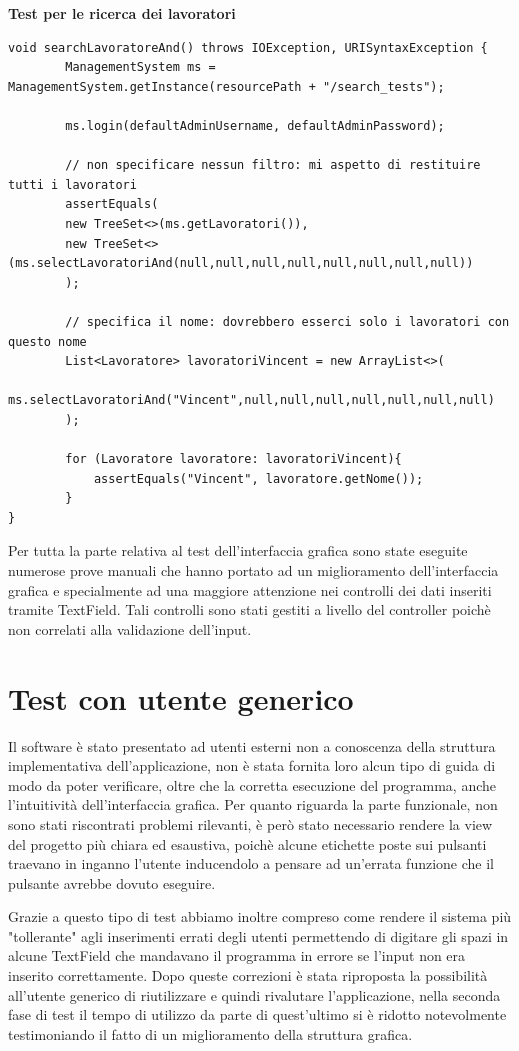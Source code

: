 \documentclass[ 4paper,11pt,openany]{book}
\begin{document}
\textbf{Test per le ricerca dei lavoratori}
\begin{lstlisting}[basicstyle=\small,xleftmargin=-0.5cm]
    void searchLavoratoreAnd() throws IOException, URISyntaxException {
        ManagementSystem ms = ManagementSystem.getInstance(resourcePath + "/search_tests");

        ms.login(defaultAdminUsername, defaultAdminPassword);

        // non specificare nessun filtro: mi aspetto di restituire tutti i lavoratori
        assertEquals(
        new TreeSet<>(ms.getLavoratori()),
        new TreeSet<>(ms.selectLavoratoriAnd(null,null,null,null,null,null,null,null))
        );

        // specifica il nome: dovrebbero esserci solo i lavoratori con questo nome
        List<Lavoratore> lavoratoriVincent = new ArrayList<>(
        ms.selectLavoratoriAnd("Vincent",null,null,null,null,null,null,null)
        );

        for (Lavoratore lavoratore: lavoratoriVincent){
            assertEquals("Vincent", lavoratore.getNome());
        }
}
\end{lstlisting}

Per tutta la parte relativa al test dell'interfaccia grafica sono state eseguite numerose prove manuali che hanno portato ad un miglioramento dell'interfaccia grafica e specialmente ad una maggiore attenzione nei controlli dei dati inseriti tramite TextField. Tali controlli sono stati gestiti a livello del controller poichè non correlati alla validazione dell'input.

\section{Test con utente generico}
Il software è stato presentato ad utenti esterni non a conoscenza della struttura implementativa dell'applicazione, non è stata fornita loro alcun tipo di guida di modo da poter verificare, oltre che la corretta esecuzione del programma, anche l'intuitività dell'interfaccia grafica. Per quanto riguarda la parte funzionale, non sono stati riscontrati problemi rilevanti, è però stato necessario rendere la view del progetto più chiara ed esaustiva, poichè alcune etichette poste sui pulsanti traevano in inganno l'utente inducendolo a pensare ad un'errata funzione che il pulsante avrebbe dovuto eseguire. 

Grazie a questo tipo di test abbiamo inoltre compreso come rendere il sistema più "tollerante" agli inserimenti errati degli utenti permettendo di digitare gli spazi in alcune TextField che mandavano il programma in errore se l'input non era inserito correttamente. Dopo queste correzioni è stata riproposta la possibilità all'utente generico di riutilizzare e quindi rivalutare l'applicazione, nella seconda fase di test il tempo di utilizzo da parte di quest'ultimo si è ridotto notevolmente testimoniando il fatto di un miglioramento della struttura grafica.
\end{document}
